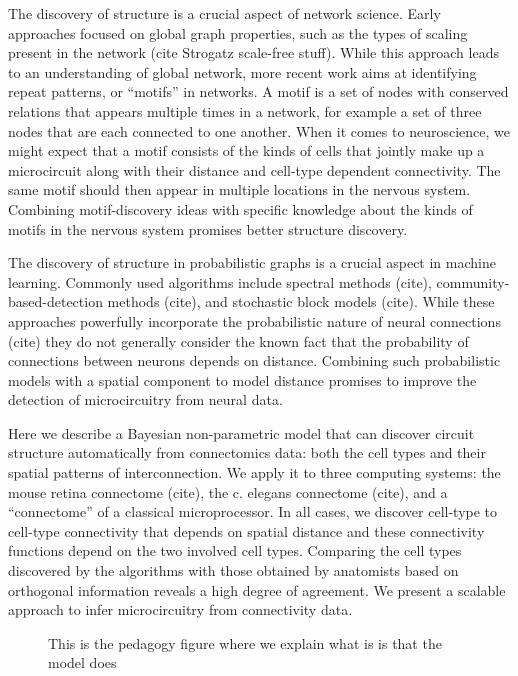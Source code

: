 \documentclass{article}
\begin{document}
The discovery of structure is a crucial aspect of network science. Early approaches focused on global graph properties, such as the types of scaling present in the network (cite Strogatz scale-free stuff).  While this approach leads to an understanding of global network, more recent work aims at identifying repeat patterns, or “motifs” in networks. A motif is a set of nodes with conserved relations that appears multiple times in a network, for example a set of three nodes that are each connected to one another. When it comes to neuroscience, we might expect that a motif consists of the kinds of cells that jointly make up a microcircuit along with their distance and cell-type dependent connectivity. The same motif should then appear in multiple locations in the nervous system. Combining motif-discovery ideas with specific knowledge about the kinds of motifs in the nervous system promises better structure discovery.

The discovery of structure in probabilistic graphs is a crucial aspect in machine learning. Commonly used algorithms include spectral methods (cite), community-based-detection methods (cite), and stochastic block models (cite). While these approaches powerfully incorporate the probabilistic nature of neural connections (cite) they do not generally consider the known fact that the probability of connections between neurons depends on distance. Combining such probabilistic models with a spatial component to model distance promises to improve the detection of microcircuitry from neural data.

Here we describe a Bayesian non-parametric model that can discover circuit structure automatically from connectomics data: both the cell types and their spatial patterns of interconnection. We apply it to three computing systems: the mouse retina connectome (cite), the c. elegans connectome (cite), and a ``connectome'' of a classical microprocessor. In all cases, we discover cell-type to cell-type connectivity that depends on spatial distance and these connectivity functions depend on the two involved cell types. Comparing the cell types discovered by the algorithms with those obtained by anatomists based on orthogonal information reveals a high degree of agreement. We present a scalable approach to infer microcircuitry from connectivity data.

\begin{figure}
  \centering 
  \caption{This is the pedagogy figure where we explain what is is that the model does }
\end{figure}
\end{document}

